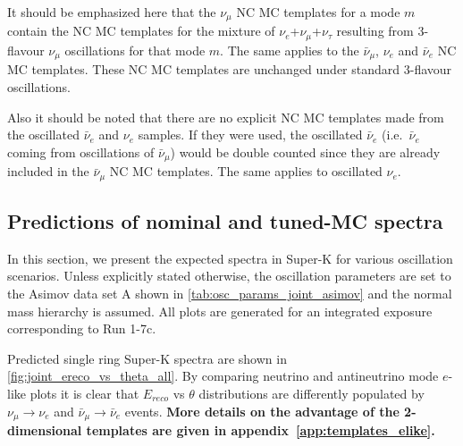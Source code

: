 It should be emphasized here that
the $\nu_{\mu}$ NC MC templates for a mode $m$ contain the
NC MC templates for the mixture of $\nu_{e}$+$\nu_{\mu}$+$\nu_{\tau}$ resulting from
3-flavour $\nu_{\mu}$ oscillations for that mode $m$. The same applies to the $\bar{\nu}_{\mu}$, $\nu_{e}$ and $\bar{\nu}_{e}$ 
NC MC templates. These NC MC templates are unchanged under standard 3-flavour oscillations.%

Also it should be noted that there are no explicit NC MC templates made from the oscillated $\bar{\nu}_{e}$ and $\nu_{e}$ 
samples. If they were used, the oscillated $\bar{\nu}_{e}$ (i.e.\ $\bar{\nu}_{e}$ coming from oscillations of $\bar{\nu}_{\mu}$) 
would be double counted since they are already included in the $\bar{\nu}_{\mu}$ NC MC templates. The same applies to oscillated 
$\nu_{e}$.


\subsection {Predictions of nominal and tuned-MC spectra}
\label{sec:nominal_and_tuned_predictions}

In this section, we present the expected spectra in Super-K for various oscillation scenarios. 
Unless explicitly stated otherwise, the oscillation 
parameters are set to the Asimov data set A shown in \cref{tab:osc_params_joint_asimov} and the normal mass hierarchy is assumed.
All plots are generated for an integrated exposure 
corresponding to Run 1-7c.


Predicted single ring Super-K spectra are shown in \cref{fig:joint_ereco_vs_theta_all}. 
By comparing neutrino and antineutrino mode $e$-like plots it is clear that $E_{reco}$ vs $\theta$ distributions are differently populated
by $\nu_{\mu} \rightarrow \nu_e$ and $\bar{\nu}_{\mu} \rightarrow \bar{\nu}_e$ events.
\textbf{More details on the advantage of the 2-dimensional templates are given in appendix~\ref{app:templates_elike}.}

